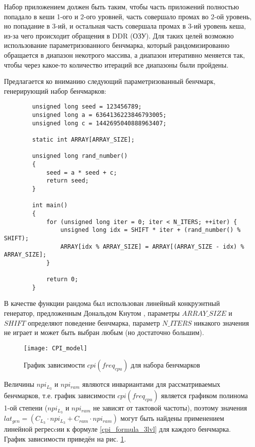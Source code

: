     Набор приложением должен быть таким, чтобы часть приложений полностью попадало в кеши 1-ого и 2-ого уровней,
    часть совершало промах во 2-ой уровень, но попадание в 3-ий, и остальная часть совершала промах в 3-ий уровень
    кеша, из-за чего происходит обращения в DDR (ОЗУ). Для таких целей возможно использование параметризованного
    бенчмарка, который рандомизированно обращается в диапазон некотрого массива, а диапазон итеративно меняется так,
    чтобы через какое-то количество итераций все диапазоны были пройдены.

    Предлагается ко вниманию следующий параметризованный бенчмарк, генерирующий набор бенчмарков:

    \begin{lstlisting}
        unsigned long seed = 123456789;
        unsigned long a = 6364136223846793005;
        unsigned long c = 1442695040888963407;

        static int ARRAY[ARRAY_SIZE];

        unsigned long rand_number()
        {
            seed = a * seed + c;
            return seed;
        }

        int main()
        {
            for (unsigned long iter = 0; iter < N_ITERS; ++iter) {
                unsigned long idx = SHIFT * iter + (rand_number() % SHIFT);
                ARRAY[idx % ARRAY_SIZE] = ARRAY[(ARRAY_SIZE - idx) % ARRAY_SIZE];
            }

            return 0;
        }
    \end{lstlisting}

    В качестве функции рандома был использован линейный конкруэнтный генератор, предложенным Дональдом Кнутом
    \cite{knuth1973art}, параметры $ARRAY\_SIZE$ и $SHIFT$ определяют поведение бенчмарка, параметр $N\_ITERS$
    никакого значения не играет и может быть выбран любым (но достаточно большим).

    \begin{figure}[!h]
        \caption{График зависимости $cpi(freq_{cpu})$ для набора бенчмарков}
        \centering
        \texttt{[image: CPI\_model]}
        \label{pic:cpi_model}
    \end{figure}

    Величины $npi_{L_3}$ и $npi_{ram}$ являются инвариантами для рассматриваемых бенчмарков, т.е.
    график зависимости $cpi(freq_{cpu})$ является графиком полинома 1-ой степени ($npi_{L_3}$ и
    $npi_{ram}$ не зависят от тактовой частоты), поэтому значения
    $lat_{gen} = \left( C_{L_3} \cdot npi_{L_3} + C_{ram} \cdot npi_{ram} \right)$ могут быть найдены
    применением линейной регресcии к формуле \eqref{cpi_formula_3lvl} для каждого бенчмарка.
    График зависимости приведён на рис. \ref{pic:cpi_model}.

